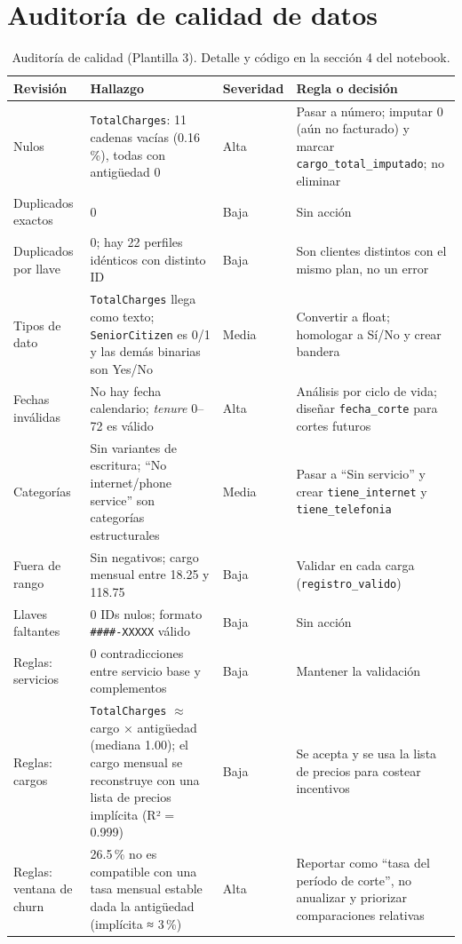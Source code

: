 \documentclass[10.5pt,a4paper]{article}
\begin{document}
\section{Auditoría de calidad de datos}
\begin{table}[H]
\centering\footnotesize
\caption{Auditoría de calidad (Plantilla 3). Detalle y código en la sección 4 del notebook.}
\begin{tabularx}{\textwidth}{@{}P{2.6cm}XP{1.2cm}X@{}}
\toprule
Revisión & Hallazgo & Severidad & Regla o decisión \\
\midrule
Nulos & \texttt{TotalCharges}: 11 cadenas vacías (0.16\,\%), todas con antigüedad 0 & Alta & Pasar a número; imputar 0 (aún no facturado) y marcar \texttt{cargo\_total\_imputado}; no eliminar \\
Duplicados exactos & 0 & Baja & Sin acción \\
Duplicados por llave & 0; hay 22 perfiles idénticos con distinto ID & Baja & Son clientes distintos con el mismo plan, no un error \\
Tipos de dato & \texttt{TotalCharges} llega como texto; \texttt{SeniorCitizen} es 0/1 y las demás binarias son Yes/No & Media & Convertir a float; homologar a Sí/No y crear bandera \\
Fechas inválidas & No hay fecha calendario; \emph{tenure} 0–72 es válido & Alta & Análisis por ciclo de vida; diseñar \texttt{fecha\_corte} para cortes futuros \\
Categorías & Sin variantes de escritura; ``No internet/phone service'' son categorías estructurales & Media & Pasar a ``Sin servicio'' y crear \texttt{tiene\_internet} y \texttt{tiene\_telefonia} \\
Fuera de rango & Sin negativos; cargo mensual entre 18.25 y 118.75 & Baja & Validar en cada carga (\texttt{registro\_valido}) \\
Llaves faltantes & 0 IDs nulos; formato \texttt{\#\#\#\#-XXXXX} válido & Baja & Sin acción \\
Reglas: servicios & 0 contradicciones entre servicio base y complementos & Baja & Mantener la validación \\
Reglas: cargos & \texttt{TotalCharges} $\approx$ cargo × antigüedad (mediana 1.00); el cargo mensual se reconstruye con una lista de precios implícita (R² = 0.999) & Baja & Se acepta y se usa la lista de precios para costear incentivos \\
Reglas: ventana de churn & 26.5\,\% no es compatible con una tasa mensual estable dada la antigüedad (implícita ≈ 3\,\%) & Alta & Reportar como ``tasa del período de corte'', no anualizar y priorizar comparaciones relativas \\
\bottomrule
\end{tabularx}
\end{table}
\end{document}
